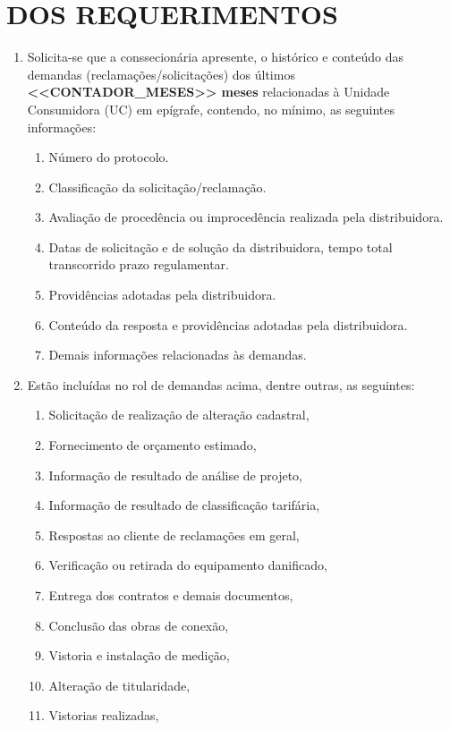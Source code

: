 \section{DOS REQUERIMENTOS}

\begin{enumerate}[resume]

\item Solicita-se que a conssecionária apresente, o histórico e conteúdo das demandas (reclamações/solicitações) dos últimos \textbf{<<CONTADOR_MESES>> meses} relacionadas à Unidade Consumidora (UC) em epígrafe, contendo, no mínimo, as seguintes informações:  
  \begin{enumerate}
    \item Número do protocolo.  
    \item Classificação da solicitação/reclamação.  
    \item Avaliação de procedência ou improcedência realizada pela distribuidora.  
    \item Datas de solicitação e de solução da distribuidora, tempo total transcorrido prazo regulamentar.  
    \item Providências adotadas pela distribuidora.  
    \item Conteúdo da resposta e providências adotadas pela distribuidora.  
    \item Demais informações relacionadas às demandas. 
  \end{enumerate}
\item Estão incluídas no rol de demandas acima, dentre outras, as seguintes:
  \begin{enumerate}
    \item Solicitação de realização de alteração cadastral,
    \item Fornecimento de orçamento estimado,
    \item Informação de resultado de análise de projeto,
    \item Informação de resultado de classificação tarifária,
    \item Respostas ao cliente de reclamações em geral,
    \item Verificação ou retirada do equipamento danificado,
    \item Entrega dos contratos e demais documentos,
    \item Conclusão das obras de conexão,
    \item Vistoria e instalação de medição,
    \item Alteração de titularidade,
    \item Vistorias realizadas,

\end{enumerate}
\end{enumerate}
